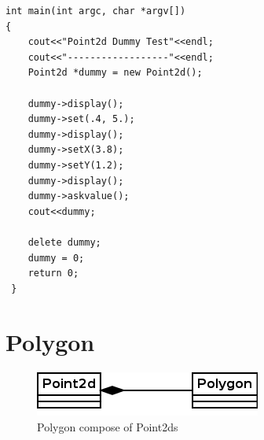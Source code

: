 \documentclass{article}
\begin{document}
\begin{lstlisting}[label=dummy-point2d,caption=Dummy Test]	
int main(int argc, char *argv[])
{
    cout<<"Point2d Dummy Test"<<endl;
    cout<<"------------------"<<endl;
    Point2d *dummy = new Point2d();

    dummy->display();
    dummy->set(.4, 5.);
    dummy->display();
    dummy->setX(3.8);
    dummy->setY(1.2);
    dummy->display();
    dummy->askvalue();
    cout<<dummy;

    delete dummy;
    dummy = 0;
    return 0;
 }
\end{lstlisting}






\section{Polygon}

\begin{figure}[ht!]
\centering
\includegraphics{Diagram1.png}
\caption{Polygon compose of Point2ds}
\end{figure}
\end{document}
